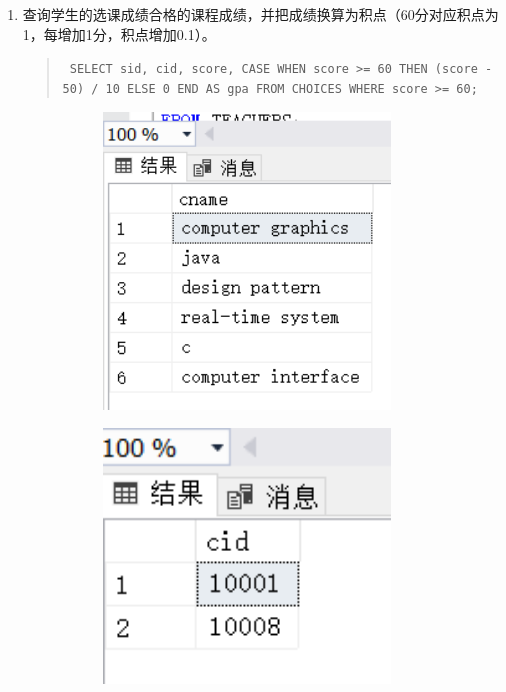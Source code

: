 \documentclass[a4paper,twoside]{article}
\begin{document}
\begin{spacing}{1.2}
\begin{enumerate}
\item 查询学生的选课成绩合格的课程成绩，并把成绩换算为积点（60分对应积点为1，每增加1分，积点增加0.1）。
\begin{quote}
\texttt{
SELECT sid, cid, score, 
       CASE WHEN score >= 60 THEN (score - 50) / 10 ELSE 0 END AS gpa
FROM CHOICES
WHERE score >= 60;
}
\end{quote}


\begin{figure}[h]
\centering
\caption{运行结果}
\begin{subfigure}{0.3\textwidth}
  \includegraphics[width=0.9\textwidth]{fig3.png}
\end{subfigure}
\begin{subfigure}{0.3\textwidth}
  \includegraphics[width=0.9\textwidth]{fig4.png}
\end{subfigure}
\end{figure}



\end{enumerate}
\end{spacing}
\end{document}
